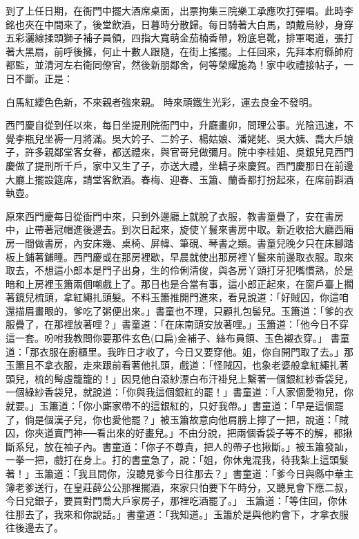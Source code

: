 到了上任日期，在衙門中擺大酒席桌面，出票拘集三院樂工承應吹打彈唱。此時李銘也夾在中間來了，後堂飲酒，日暮時分散歸。每日騎著大白馬，頭戴烏紗，身穿五彩灑線揉頭獅子補子員領，四指大寬萌金茄楠香帶，粉底皂靴，排軍喝道，張打著大黑扇，前呼後擁，何止十數人跟隨，在街上搖擺。上任回來，先拜本府縣帥府都監，並清河左右衛同僚官，然後新朋鄰舍，何等榮耀施為！家中收禮接帖子，一日不斷。正是：

白馬紅纓色色新，不來親者強來親。
時來頑鐵生光彩，運去良金不發明。

西門慶自從到任以來，每日坐提刑院衙門中，升廳畫卯，問理公事。光陰迅速，不覺李瓶兒坐褥一月將滿。吳大妗子、二妗子、楊姑娘、潘姥姥、吳大姨、喬大戶娘子，許多親鄰堂客女眷，都送禮來，與官哥兒做彌月。院中李桂姐、吳銀兒見西門慶做了提刑所千戶，家中又生了子，亦送大禮，坐轎子來慶賀。西門慶那日在前邊大廳上擺設筵席，請堂客飲酒。春梅、迎春、玉簫、蘭香都打扮起來，在席前斟酒執壺。

原來西門慶每日從衙門中來，只到外邊廳上就脫了衣服，教書童疊了，安在書房中，止帶著冠帽進後邊去。到次日起來，旋使丫鬟來書房中取。新近收拾大廳西廂房一間做書房，內安床幾、桌椅、屏幃、筆硯、琴書之類。書童兒晚夕只在床腳踏板上鋪著鋪睡。西門慶或在那房裡歇，早晨就使出那房裡丫鬟來前邊取衣服。取來取去，不想這小郎本是門子出身，生的伶俐清俊，與各房丫頭打牙犯嘴慣熟，於是暗和上房裡玉簫兩個嘲戲上了。那日也是合當有事，這小郎正起來，在窗戶臺上擱著鏡兒梳頭，拿紅繩扎頭髮。不料玉簫推開門進來，看見說道：「好賊囚，你這咱還描眉畫眼的，爹吃了粥便出來。」書童也不理，只顧扎包髻兒。玉簫道：「爹的衣服疊了，在那裡放著哩？」書童道：「在床南頭安放著哩。」玉簫道：「他今日不穿這一套。吩咐我教問你要那件玄色(口扁)金補子、絲布員領、玉色襯衣穿。」 書童道：「那衣服在廚櫃里。我昨日才收了，今日又要穿他。姐，你自開門取了去。」那玉簫且不拿衣服，走來跟前看著他扎頭，戲道：「怪賊囚，也象老婆般拿紅繩扎著頭兒，梳的髩虛籠籠的！」因見他白滾紗漂白布汗褂兒上繫著一個銀紅紗香袋兒，一個綠紗香袋兒，就說道：「你與我這個銀紅的罷！」書童道：「人家個愛物兒，你就要。」玉簫道：「你小廝家帶不的這銀紅的，只好我帶。」書童道：「早是這個罷了，倘是個漢子兒，你也愛他罷？」被玉簫故意向他肩膀上擰了一把，說道：「賊囚，你夾道賣門神──看出來的好畫兒。」不由分說，把兩個香袋子等不的解，都揪斷系兒，放在袖子內。書童道：「你子不尊貴，把人的帶子也揪斷。」被玉簫發訕，一拳一把，戲打在身上。打的書童急了，說：「姐，你休鬼混我，待我紮上這頭髮著！」玉簫道：「我且問你，沒聽見爹今日往那去？」書童道：「爹今日與縣中華主簿老爹送行，在皇莊薛公公那裡擺酒，來家只怕要下午時分，又聽見會下應二叔，今日兌銀子，要買對門喬大戶家房子，那裡吃酒罷了。」 玉簫道：「等住回，你休往那去了，我來和你說話。」書童道：「我知道。」玉簫於是與他約會下，才拿衣服往後邊去了。

